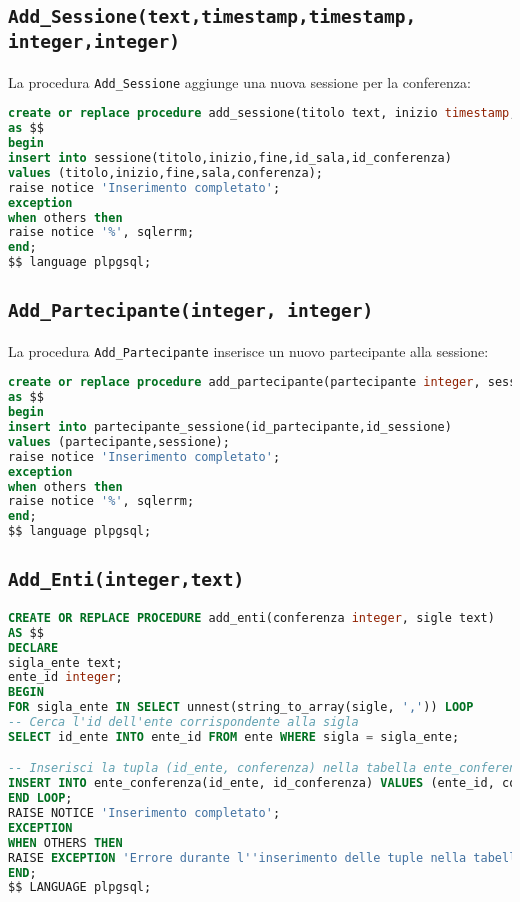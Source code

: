 \subsection{\texttt{Add\_Sessione(text,timestamp,timestamp, integer,integer)}}
La procedura \texttt{Add\_Sessione} aggiunge una nuova sessione per la conferenza:
\begin{lstlisting}[language=SQL, style=mystyle]
create or replace procedure add_sessione(titolo text, inizio timestamp, fine timestamp, sala integer, conferenza integer)
as $$
begin
insert into sessione(titolo,inizio,fine,id_sala,id_conferenza)
values (titolo,inizio,fine,sala,conferenza);
raise notice 'Inserimento completato';
exception
when others then
raise notice '%', sqlerrm;
end;
$$ language plpgsql;
\end{lstlisting}
\subsection{\texttt{Add\_Partecipante(integer, integer)}}
La procedura \texttt{Add\_Partecipante} inserisce un nuovo partecipante alla sessione:
\begin{lstlisting}[language=SQL, style=mystyle]
create or replace procedure add_partecipante(partecipante integer, sessione integer)
as $$
begin
insert into partecipante_sessione(id_partecipante,id_sessione)
values (partecipante,sessione);
raise notice 'Inserimento completato';
exception
when others then
raise notice '%', sqlerrm;
end;
$$ language plpgsql;
\end{lstlisting}
\subsection{\texttt{Add\_Enti(integer,text)}}
\begin{lstlisting}[language=SQL,style=mystyle]
CREATE OR REPLACE PROCEDURE add_enti(conferenza integer, sigle text)
AS $$
DECLARE
sigla_ente text;
ente_id integer;
BEGIN
FOR sigla_ente IN SELECT unnest(string_to_array(sigle, ',')) LOOP
-- Cerca l'id dell'ente corrispondente alla sigla
SELECT id_ente INTO ente_id FROM ente WHERE sigla = sigla_ente;

-- Inserisci la tupla (id_ente, conferenza) nella tabella ente_conferenza
INSERT INTO ente_conferenza(id_ente, id_conferenza) VALUES (ente_id, conferenza);
END LOOP;
RAISE NOTICE 'Inserimento completato';
EXCEPTION
WHEN OTHERS THEN
RAISE EXCEPTION 'Errore durante l''inserimento delle tuple nella tabella ente_conferenza: %', SQLERRM;
END;
$$ LANGUAGE plpgsql;
\end{lstlisting}
